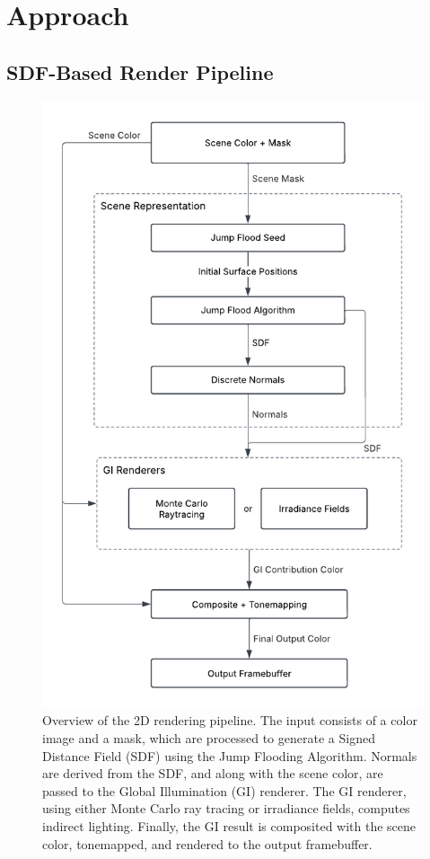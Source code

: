 \documentclass[acmtog, nonacm]{acmart}
\begin{document}
\section{Approach}
\subsection{SDF-Based Render Pipeline}

\begin{figure}[ht]
  \centering
  \includegraphics[width=.7\linewidth]{pipeline.pdf}
  \caption{Overview of the 2D rendering pipeline. The input consists of a color image and a mask, which are processed to generate a Signed Distance Field (SDF) using the Jump Flooding Algorithm. Normals are derived from the SDF, and along with the scene color, are passed to the Global Illumination (GI) renderer. The GI renderer, using either Monte Carlo ray tracing or irradiance fields, computes indirect lighting. Finally, the GI result is composited with the scene color, tonemapped, and rendered to the output framebuffer.}
\end{figure}
\end{document}
